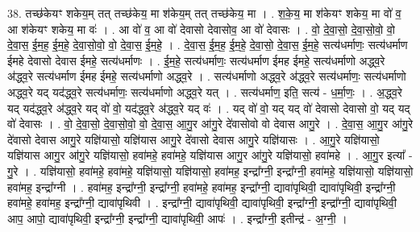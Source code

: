 \documentclass[17pt]{extarticle}
\begin{document}
38. तच्छ॑केयꣳ शकेय॒म् तत् तच्छ॑केय॒ मा श॑केय॒म् तत् तच्छ॑केय॒ मा । . श॒के॒य॒ मा श॑केयꣳ शकेय॒ मा वो॑ व॒ आ श॑केयꣳ शकेय॒ मा वः॑ । . आ वो॑ व॒ आ वो॑ देवासो देवासोव॒ आ वो॑ देवासः । . वो॒ दे॒वा॒सो॒ दे॒वा॒सो॒वो॒ वो॒ दे॒वा॒स॒ ई॒म॒ह॒ ई॒म॒हे॒ दे॒वा॒सो॒वो॒ वो॒ दे॒वा॒स॒ ई॒म॒हे॒ । . दे॒वा॒स॒ ई॒म॒ह॒ ई॒म॒हे॒ दे॒वा॒सो॒ दे॒वा॒स॒ ई॒म॒हे॒ सत्य॑धर्माणः॒ सत्य॑धर्माण ईमहे देवासो देवास ईमहे॒ सत्य॑धर्माणः । . ई॒म॒हे॒ सत्य॑धर्माणः॒ सत्य॑धर्माण ईमह ईमहे॒ सत्य॑धर्माणो अद्ध्व॒रे अ॑द्ध्व॒रे सत्य॑धर्माण ईमह ईमहे॒ सत्य॑धर्माणो अद्ध्व॒रे । . सत्य॑धर्माणो अद्ध्व॒रे अ॑द्ध्व॒रे सत्य॑धर्माणः॒ सत्य॑धर्माणो अद्ध्व॒रे यद् यद॑द्ध्व॒रे सत्य॑धर्माणः॒ सत्य॑धर्माणो अद्ध्व॒रे यत् । . सत्य॑धर्माण॒ इति॒ सत्य॑ - ध॒र्मा॒णः॒ । . अ॒द्ध्व॒रे यद् यद॑द्ध्व॒रे अ॑द्ध्व॒रे यद् वो॑ वो॒ यद॑द्ध्व॒रे अ॑द्ध्व॒रे यद् वः॑ । . यद् वो॑ वो॒ यद् यद् वो॑ देवासो देवासो वो॒ यद् यद् वो॑ देवासः । . वो॒ दे॒वा॒सो॒ दे॒वा॒सो॒वो॒ वो॒ दे॒वा॒स॒ आ॒गु॒र आ॑गु॒रे दे॑वासोवो वो देवास आगु॒रे । . दे॒वा॒स॒ आ॒गु॒र आ॑गु॒रे दे॑वासो देवास आगु॒रे यज्ञि॑यासो॒ यज्ञि॑यास आगु॒रे दे॑वासो देवास आगु॒रे यज्ञि॑यासः । . आ॒गु॒रे यज्ञि॑यासो॒ यज्ञि॑यास आगु॒र आ॑गु॒रे यज्ञि॑यासो॒ हवा॑महे॒ हवा॑महे॒ यज्ञि॑यास आगु॒र आ॑गु॒रे यज्ञि॑यासो॒ हवा॑महे । . आ॒गु॒र इत्या᳚ - गु॒रे । . यज्ञि॑यासो॒ हवा॑महे॒ हवा॑महे॒ यज्ञि॑यासो॒ यज्ञि॑यासो॒ हवा॑मह॒ इन्द्रा᳚ग्नी॒ इन्द्रा᳚ग्नी॒ हवा॑महे॒ यज्ञि॑यासो॒ यज्ञि॑यासो॒ हवा॑मह॒ इन्द्रा᳚ग्नी । . हवा॑मह॒ इन्द्रा᳚ग्नी॒ इन्द्रा᳚ग्नी॒ हवा॑महे॒ हवा॑मह॒ इन्द्रा᳚ग्नी॒ द्यावा॑पृथिवी॒ द्यावा॑पृथिवी॒ इन्द्रा᳚ग्नी॒ हवा॑महे॒ हवा॑मह॒ इन्द्रा᳚ग्नी॒ द्यावा॑पृथिवी । . इन्द्रा᳚ग्नी॒ द्यावा॑पृथिवी॒ द्यावा॑पृथिवी॒ इन्द्रा᳚ग्नी॒ इन्द्रा᳚ग्नी॒ द्यावा॑पृथिवी॒ आप॒ आपो॒ द्यावा॑पृथिवी॒ इन्द्रा᳚ग्नी॒ इन्द्रा᳚ग्नी॒ द्यावा॑पृथिवी॒ आपः॑ । . इन्द्रा᳚ग्नी॒ इतीन्द्र॑ - अ॒ग्नी॒ । \newline
\end{document}
